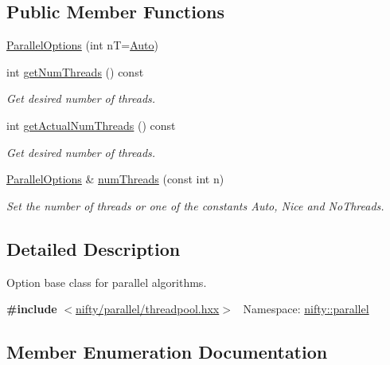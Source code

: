 \subsection*{Public Member Functions}
\begin{DoxyCompactItemize}
\item 
\hyperlink{classnifty_1_1parallel_1_1ParallelOptions_ae1b1ff787e99e1f4ea75a2d8cb7e3d43}{Parallel\+Options} (int nT=\hyperlink{classnifty_1_1parallel_1_1ParallelOptions_a7a945e8bd698883de4af0f906b2aa88aa0bd8f9fd00d78fcfdcb6ee1575f43fd6}{Auto})
\item 
int \hyperlink{classnifty_1_1parallel_1_1ParallelOptions_a25312a5665cb4240e07a989bbf05cf7b}{get\+Num\+Threads} () const
\begin{DoxyCompactList}\small\item\em Get desired number of threads. \end{DoxyCompactList}\item 
int \hyperlink{classnifty_1_1parallel_1_1ParallelOptions_a0d905f623f4de9ce01361065c0042c50}{get\+Actual\+Num\+Threads} () const
\begin{DoxyCompactList}\small\item\em Get desired number of threads. \end{DoxyCompactList}\item 
\hyperlink{classnifty_1_1parallel_1_1ParallelOptions}{Parallel\+Options} \& \hyperlink{classnifty_1_1parallel_1_1ParallelOptions_a50e3d373c07fb36be7b3b39bf6886b9b}{num\+Threads} (const int n)
\begin{DoxyCompactList}\small\item\em Set the number of threads or one of the constants {\ttfamily Auto}, {\ttfamily Nice} and {\ttfamily No\+Threads}. \end{DoxyCompactList}\end{DoxyCompactItemize}


\subsection{Detailed Description}
Option base class for parallel algorithms. 

{\bfseries \#include} $<$\hyperlink{threadpool_8hxx}{nifty/parallel/threadpool.\+hxx}$>$~\newline
 Namespace\+: \hyperlink{namespacenifty_1_1parallel}{nifty\+::parallel} 

\subsection{Member Enumeration Documentation}
\mbox{\label{classnifty_1_1parallel_1_1ParallelOptions_a7a945e8bd698883de4af0f906b2aa88a}} 
